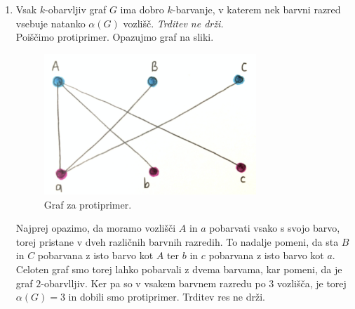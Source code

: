 \documentclass[a4paper,11pt]{article}
\begin{document}
\begin{enumerate}
    \item Vsak $k$-obarvljiv graf $G$ ima dobro $k$-barvanje, v katerem nek barvni razred vsebuje natanko $\alpha(G)$ vozlišč. \textit{Trditev ne drži.}
        \\
        Poiščimo protiprimer.
        Opazujmo graf na sliki.
        \begin{figure}[ht!]
            \centering
            \includegraphics[width=80mm]{ABCabc.png}
            \caption{Graf za protiprimer.}
        \end{figure}

        \noindent
        Najprej opazimo, da moramo vozlišči $A$ in $a$ pobarvati vsako s svojo barvo, torej pristane v dveh različnih barvnih razredih.
        To nadalje pomeni, da sta $B$ in $C$ pobarvana z isto barvo kot $A$ ter $b$ in $c$ pobarvana z isto barvo kot $a$. 
        Celoten graf smo torej lahko pobarvali z dvema barvama, kar pomeni, da je graf $2$-obarvlljiv.
        Ker pa so v vsakem barvnem razredu po 3 vozlišča, je torej $\alpha(G) = 3$ in dobili smo protiprimer. Trditev res ne drži.



\end{enumerate}
\end{document}
